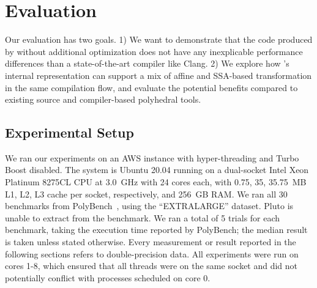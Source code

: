\section{Evaluation}
Our evaluation has two goals. 1) We want to demonstrate that the code produced by \tool without additional optimization does not have any inexplicable performance differences than a state-of-the-art compiler like Clang. 2) We explore how \tool's internal representation can support a mix of affine and SSA-based transformation in the same compilation flow, and evaluate the potential benefits compared to existing source and compiler-based polyhedral tools.


\subsection{Experimental Setup}

We ran our experiments on an AWS  instance with hyper-threading and Turbo Boost disabled. %
The system is Ubuntu 20.04 running on a dual-socket Intel Xeon Platinum 8275CL CPU at 3.0~GHz with 24 cores each, with 0.75, 35, 35.75~MB L1, L2, L3 cache per socket, respectively, and 256~GB RAM.
We ran all 30 benchmarks from PolyBench~\cite{polybench}, using the ``EXTRALARGE'' dataset. Pluto is unable to extract \scop from the  benchmark. We ran a total of 5 trials for each benchmark, taking the execution time reported by PolyBench; the median result is taken unless stated otherwise. Every measurement or result reported in the following sections refers to double-precision data. All experiments were run on cores 1-8, which ensured that all threads were on the same socket and did not potentially conflict with processes scheduled on core 0.


